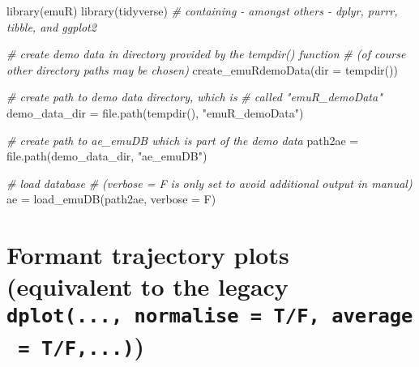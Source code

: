 \documentclass[
]{book}
\newenvironment{Shaded}{\begin{snugshade}}{\end{snugshade}}
\newcommand{\AttributeTok}[1]{\textcolor[rgb]{0.77,0.63,0.00}{#1}}
\newcommand{\CommentTok}[1]{\textcolor[rgb]{0.56,0.35,0.01}{\textit{#1}}}
\newcommand{\FunctionTok}[1]{\textcolor[rgb]{0.00,0.00,0.00}{#1}}
\newcommand{\NormalTok}[1]{#1}
\newcommand{\OtherTok}[1]{\textcolor[rgb]{0.56,0.35,0.01}{#1}}
\newcommand{\StringTok}[1]{\textcolor[rgb]{0.31,0.60,0.02}{#1}}
\begin{document}
\begin{Shaded}
\begin{Highlighting}[]
\FunctionTok{library}\NormalTok{(emuR)}
\FunctionTok{library}\NormalTok{(tidyverse) }\CommentTok{\# containing {-} amongst others {-} dplyr, purrr, tibble, and ggplot2}

\CommentTok{\# create demo data in directory provided by the tempdir() function}
\CommentTok{\# (of course other directory paths may be chosen)}
\FunctionTok{create\_emuRdemoData}\NormalTok{(}\AttributeTok{dir =} \FunctionTok{tempdir}\NormalTok{())}

\CommentTok{\# create path to demo data directory, which is}
\CommentTok{\# called "emuR\_demoData"}
\NormalTok{demo\_data\_dir }\OtherTok{=} \FunctionTok{file.path}\NormalTok{(}\FunctionTok{tempdir}\NormalTok{(), }
                          \StringTok{"emuR\_demoData"}\NormalTok{)}

\CommentTok{\# create path to ae\_emuDB which is part of the demo data}
\NormalTok{path2ae }\OtherTok{=} \FunctionTok{file.path}\NormalTok{(demo\_data\_dir, }
                    \StringTok{"ae\_emuDB"}\NormalTok{)}

\CommentTok{\# load database}
\CommentTok{\# (verbose = F is only set to avoid additional output in manual)}
\NormalTok{ae }\OtherTok{=} \FunctionTok{load\_emuDB}\NormalTok{(path2ae, }\AttributeTok{verbose =}\NormalTok{ F)}
\end{Highlighting}
\end{Shaded}

\hypertarget{formant-trajectory-plots-equivalent-to-the-legacy-dplot...-normalise-tf-average-tf...}{%
\section{\texorpdfstring{Formant trajectory plots (equivalent to the legacy \texttt{dplot(...,\ normalise\ =\ T/F,\ average\ =\ T/F,...)})}{Formant trajectory plots (equivalent to the legacy dplot(..., normalise = T/F, average = T/F,...))}}\label{formant-trajectory-plots-equivalent-to-the-legacy-dplot...-normalise-tf-average-tf...}}
\end{document}
